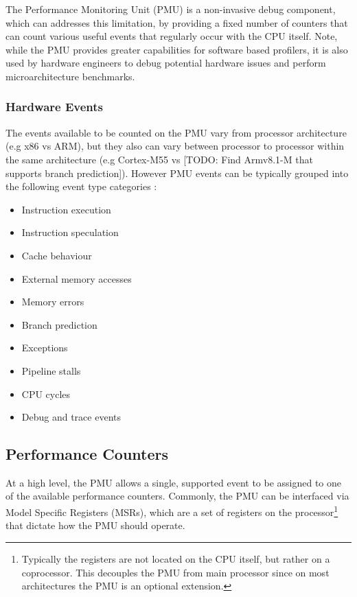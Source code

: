 {The Performance Monitoring Unit (PMU) is a non-invasive debug component, which can addresses this limitation, by providing a fixed number of counters that can count various useful events that regularly occur with the CPU itself. Note, while the PMU provides greater capabilities for software based profilers, it is also used by hardware engineers to debug potential hardware issues and perform microarchitecture benchmarks.

\subsubsection{Hardware Events}

The events available to be counted on the PMU vary from processor architecture (e.g x86 vs ARM), but they also can vary between processor to processor within the same architecture (e.g Cortex-M55 vs [TODO: Find Armv8.1-M that supports branch prediction]). However PMU events can be typically grouped into the following event type categories \cite{DocsArmv8PMU}:

\begin{multicols}{2}
\ssp
\begin{itemize}
    \item Instruction execution
    \item Instruction speculation
    \item Cache behaviour 
    \item External memory accesses
    \item Memory errors
\end{itemize}
\columnbreak
\begin{itemize}
    \item Branch prediction
    \item Exceptions
    \item Pipeline stalls
    \item CPU cycles
    \item Debug and trace events
\end{itemize}
\dsp
\end{multicols}

\subsection{Performance Counters}

At a high level, the PMU allows a single, supported event to be assigned to one of the available performance counters. Commonly, the PMU can be interfaced via Model Specific Registers (MSRs), which are a set of registers on the processor\footnote{Typically the registers are not located on the CPU itself, but rather on a coprocessor. This decouples the PMU from main processor since on most architectures the PMU is an optional extension.} that dictate how the PMU should operate.

}
